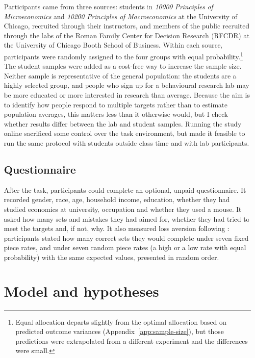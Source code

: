 \documentclass[12pt, letterpaper]{article}
\begin{document}
Participants came from three sources: students in \emph{10000 Principles of Microeconomics} and \emph{10200 Principles of Macroeconomics} at the University of Chicago, recruited through their instructors, and members of the public recruited through the labs of the Roman Family Center for Decision Research (RFCDR) at the University of Chicago Booth School of Business. Within each source, participants were randomly assigned to the four groups with equal probability.\footnote{Equal allocation departs slightly from the optimal allocation based on predicted outcome variances (Appendix~\ref{app:sample-size}), but those predictions were extrapolated from a different experiment and the differences were small.} The student samples were added as a cost-free way to increase the sample size. Neither sample is representative of the general population: the students are a highly selected group, and people who sign up for a behavioural research lab may be more educated or more interested in research than average. Because the aim is to identify how people respond to multiple targets rather than to estimate population averages, this matters less than it otherwise would, but I check whether results differ between the lab and student samples. Running the study online sacrificed some control over the task environment, but made it feasible to run the same protocol with students outside class time and with lab participants.

\subsection{Questionnaire}

After the task, participants could complete an optional, unpaid questionnaire. It recorded gender, race, age, household income, education, whether they had studied economics at university, occupation and whether they used a mouse. It asked how many sets and mistakes they had aimed for, whether they had tried to meet the targets and, if not, why. It also measured loss aversion following \textcite{campos-mercade.2024.gustibusdisputes}: participants stated how many correct sets they would complete under seven fixed piece rates, and under seven random piece rates (a high or a low rate with equal probability) with the same expected values, presented in random order.

\section{Model and hypotheses}\label{sec:model}
\end{document}
